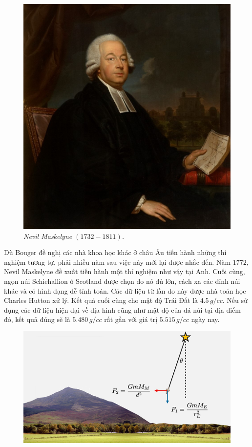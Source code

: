 \begin{multicols}{2}
\begin{figure}[H]
		\includegraphics[width =0.75\linewidth]{9}
		\caption{\small\textit{\color{timhieukhoahoc}Nevil Maskelyne $(1732-1811)$.}}
		\vspace*{-5pt}
	\end{figure}
	Dù Bouger đề nghị các nhà khoa học khác ở châu Âu tiến hành những thí nghiệm tương tự, phải nhiều năm sau việc này mới lại được nhắc đến. Năm $1772$, Nevil Maskelyne đề xuất tiến hành một thí nghiệm như vậy tại Anh. Cuối cùng, ngọn núi Schiehallion ở Scotland được chọn do nó đủ lớn, cách xa các đỉnh núi khác và có hình dạng dễ tính toán. Các dữ liệu từ lần đo này được nhà toán học Charles Hutton xử lý. Kết quả cuối cùng cho mật độ Trái Đất là $4{.}5 \,g/cc$. Nếu sử dụng các dữ liệu hiện đại về địa hình cũng như mật độ của đá núi tại địa điểm đó, kết quả đúng sẽ là $5{.}480\, g/cc$ rất gần với giá trị $5{.}515\, g/cc$ ngày nay.
	\begin{figure}[H]
		\vspace*{-5pt}
		\centering
		\captionsetup{labelformat= empty, justification=centering}
		\includegraphics[width =1\linewidth]{10}

\end{figure}
\end{multicols}
